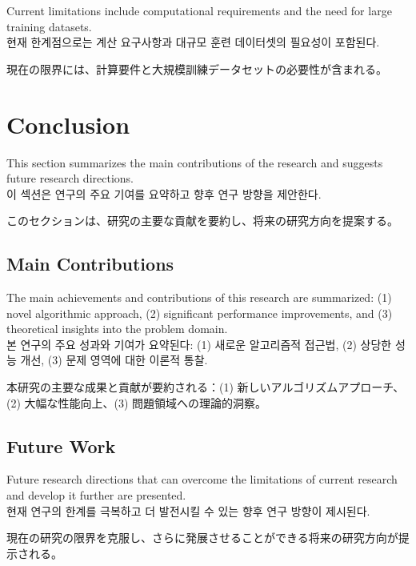 \documentclass[12pt,a4paper]{article}
\begin{document}
Current limitations include computational requirements and the need for large training datasets. \\
현재 한계점으로는 계산 요구사항과 대규모 훈련 데이터셋의 필요성이 포함된다. \\
\begin{CJK}{UTF8}{min}
現在の限界には、計算要件と大規模訓練データセットの必要性が含まれる。
\end{CJK}

\section{Conclusion}
\label{sec:conclusion}

This section summarizes the main contributions of the research and suggests future research directions. \\
이 섹션은 연구의 주요 기여를 요약하고 향후 연구 방향을 제안한다. \\
\begin{CJK}{UTF8}{min}
このセクションは、研究の主要な貢献を要約し、将来の研究方向を提案する。
\end{CJK}

\subsection{Main Contributions}
The main achievements and contributions of this research are summarized: (1) novel algorithmic approach, (2) significant performance improvements, and (3) theoretical insights into the problem domain. \\
본 연구의 주요 성과와 기여가 요약된다: (1) 새로운 알고리즘적 접근법, (2) 상당한 성능 개선, (3) 문제 영역에 대한 이론적 통찰. \\
\begin{CJK}{UTF8}{min}
本研究の主要な成果と貢献が要約される：(1) 新しいアルゴリズムアプローチ、(2) 大幅な性能向上、(3) 問題領域への理論的洞察。
\end{CJK}

\subsection{Future Work}
Future research directions that can overcome the limitations of current research and develop it further are presented. \\
현재 연구의 한계를 극복하고 더 발전시킬 수 있는 향후 연구 방향이 제시된다. \\
\begin{CJK}{UTF8}{min}
現在の研究の限界を克服し、さらに発展させることができる将来の研究方向が提示される。
\end{CJK}
\end{document}
